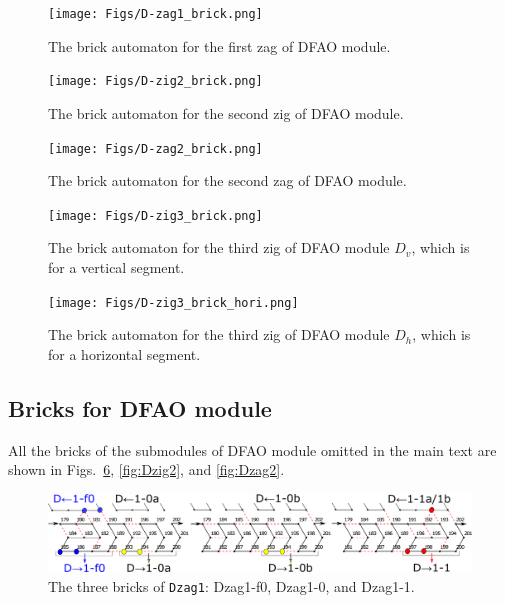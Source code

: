 \documentclass[dvipdfmx,review]{elsarticle}
\begin{document}
\begin{figure}[ht]
\centering
\texttt{[image: Figs/D-zag1\_brick.png]}
\caption{The brick automaton for the first zag of DFAO module.}
\label{fig:brick_automaton_Dzag1}
\end{figure}

\begin{figure}[ht]
\centering
\texttt{[image: Figs/D-zig2\_brick.png]}
\caption{The brick automaton for the second zig of DFAO module.}
\label{fig:brick_automaton_Dzig2}
\end{figure}

\begin{figure}[ht]
\centering
\texttt{[image: Figs/D-zag2\_brick.png]}
\caption{The brick automaton for the second zag of DFAO module.}
\label{fig:brick_automaton_Dzag2}
\end{figure}

\begin{figure}[ht]
\centering
\texttt{[image: Figs/D-zig3\_brick.png]}
\caption{The brick automaton for the third zig of DFAO module $D_v$, which is for a vertical segment.}
\label{fig:brick_automaton_Dzig3}
\end{figure}

\begin{figure}[ht]
\centering
\texttt{[image: Figs/D-zig3\_brick\_hori.png]}
\caption{The brick automaton for the third zig of DFAO module $D_h$, which is for a horizontal segment.}
\label{fig:brick_automaton_Dzig3_hori}
\end{figure}

\clearpage

	\subsection{Bricks for DFAO module}
	\label{ap_subsect:DFAO_module_bricks}

All the bricks of the submodules of DFAO module omitted in the main text are shown in Figs.~\ref{fig:Dzag1}, \ref{fig:Dzig2}, and \ref{fig:Dzag2}. 

\begin{figure}[h]
\centering
\includegraphics[width=\linewidth]{Figs/DFAO-zag1.png}
\caption{The three bricks of \texttt{Dzag1}: Dzag1-f0, Dzag1-0, and Dzag1-1.}
\label{fig:Dzag1}
\end{figure}
\end{document}
